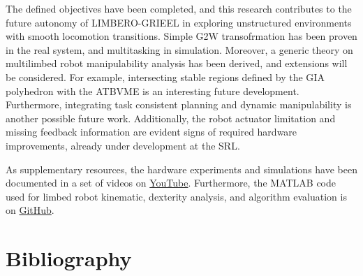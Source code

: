 \documentclass[11pt,a4paper,twocolumn]{article}
\begin{document}
The defined objectives have been completed, and this research contributes to the future autonomy of LIMBERO-GRIEEL in exploring unstructured environments with smooth locomotion transitions. Simple G2W transofrmation has been proven in the real system, and multitasking in simulation. Moreover, a generic theory on multilimbed robot manipulability analysis has been derived, and extensions will be considered. 
For example, intersecting stable regions defined by the GIA polyhedron\cite{GIA_polyedron} with the ATBVME is an interesting future development. Furthermore,  integrating task consistent planning \cite{TaskCompatibilityPosture} and dynamic manipulability is another possible future work. Additionally, the robot actuator limitation and missing feedback information are evident signs of required hardware improvements, already under development at the SRL. 

\vspace{0.5cm}
\begin{tcolorbox}[
      colback=bluepoli!20,
      colframe=bluepoli!40, 
      title=Additional Resources,
      sharp corners=south,
      fonttitle=\bfseries,
      coltitle=bluepoli!90!black,
    ]
    As supplementary resources, the hardware experiments and simulations have been documented in a set of videos on \href{https://youtube.com/playlist?list=PLFgoOtxCJKTPv_dibdvSUT_YPGDJBc_5C&si=bgCxZ_qWpax2N8Xt}{YouTube}.
    Furthermore, the MATLAB code used for limbed robot kinematic, dexterity analysis, and algorithm evaluation is on \href{https://github.com/AlePuglisi/limbed-robot-control}{GitHub}.
\end{tcolorbox}
\vspace{0.5cm}

\section*{Bibliography}
\label{sec:bibliography}

\end{document}
